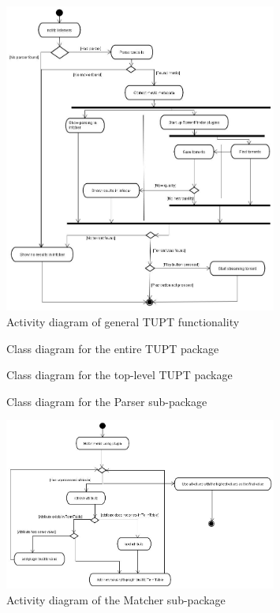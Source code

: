 \begin{figure}[hp]
  \centering
      \includegraphics[width=0.8\textwidth]{TUPT-activitydiagram.jpg}
  \caption{Activity diagram of general TUPT functionality}
  \label{fig:activitytupt}
\end{figure}

\begin{figure}[hp]
  \centering
\tikzimgGeneralTUPT
  \caption{Class diagram for the entire TUPT package}
  \label{fig:classdiagramgeneraltupt}
\end{figure}

\begin{figure}[hp]
  \centering
\tikzimgSpecificTUPT
  \caption{Class diagram for the top-level TUPT package}
  \label{fig:classdiagramspecifictupt}
\end{figure}

\begin{figure}[hp]
  \centering
\tikzimgParser
  \caption{Class diagram for the Parser sub-package}
  \label{fig:classdiagramparser}
\end{figure}

\begin{figure}[hp]
  \centering
      \includegraphics[width=0.8\textwidth]{Matcher-activitydiagram.jpg}
  \caption{Activity diagram of the Matcher sub-package}
  \label{fig:activitymatcher}
\end{figure}

